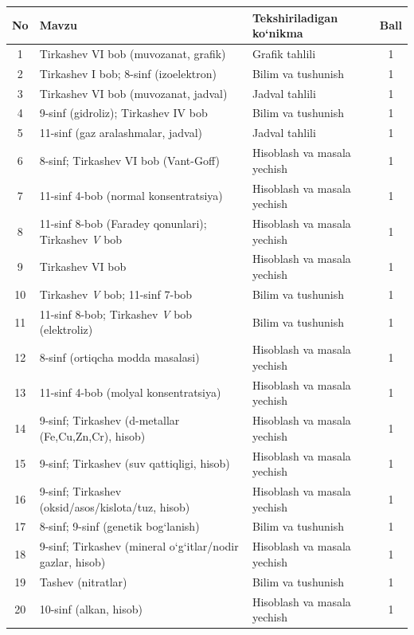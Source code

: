 \documentclass[11pt,a4paper]{article}
\begin{document}
{\small\noindent\begin{longtable}{|c|p{7.2cm}|p{5.4cm}|c|}\hline \textbf{No} & \textbf{Mavzu} & \textbf{Tekshiriladigan ko`nikma} & \textbf{Ball}\\\hline
1 & Tirkashev VI bob (muvozanat, grafik) & Grafik tahlili & 1\\\hline
2 & Tirkashev I bob; 8-sinf (izoelektron) & Bilim va tushunish & 1\\\hline
3 & Tirkashev VI bob (muvozanat, jadval) & Jadval tahlili & 1\\\hline
4 & 9-sinf (gidroliz); Tirkashev IV bob & Bilim va tushunish & 1\\\hline
5 & 11-sinf (gaz aralashmalar, jadval) & Jadval tahlili & 1\\\hline
6 & 8-sinf; Tirkashev VI bob (Vant-Goff) & Hisoblash va masala yechish & 1\\\hline
7 & 11-sinf 4-bob (normal konsentratsiya) & Hisoblash va masala yechish & 1\\\hline
8 & 11-sinf 8-bob (Faradey qonunlari); Tirkashev \textit{V} bob & Hisoblash va masala yechish & 1\\\hline
9 & Tirkashev VI bob & Hisoblash va masala yechish & 1\\\hline
10 & Tirkashev \textit{V} bob; 11-sinf 7-bob & Bilim va tushunish & 1\\\hline
11 & 11-sinf 8-bob; Tirkashev \textit{V} bob (elektroliz) & Bilim va tushunish & 1\\\hline
12 & 8-sinf (ortiqcha modda masalasi) & Hisoblash va masala yechish & 1\\\hline
13 & 11-sinf 4-bob (molyal konsentratsiya) & Hisoblash va masala yechish & 1\\\hline
14 & 9-sinf; Tirkashev (d-metallar (Fe,Cu,Zn,Cr), hisob) & Hisoblash va masala yechish & 1\\\hline
15 & 9-sinf; Tirkashev (suv qattiqligi, hisob) & Hisoblash va masala yechish & 1\\\hline
16 & 9-sinf; Tirkashev (oksid/asos/kislota/tuz, hisob) & Hisoblash va masala yechish & 1\\\hline
17 & 8-sinf; 9-sinf (genetik bog`lanish) & Bilim va tushunish & 1\\\hline
18 & 9-sinf; Tirkashev (mineral o`g`itlar/nodir gazlar, hisob) & Hisoblash va masala yechish & 1\\\hline
19 & Tashev (nitratlar) & Bilim va tushunish & 1\\\hline
20 & 10-sinf (alkan, hisob) & Hisoblash va masala yechish & 1\\\hline

\end{longtable}}
\end{document}
